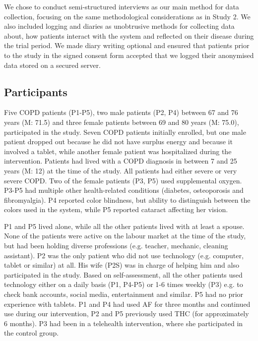 We chose to conduct semi-structured interviews as our main method for data collection, focusing on the same methodological considerations as in Study 2. We also included logging and diaries as unobtrusive methods for collecting data about, how patients interact with the system and reflected on their disease during the trial period. We made diary writing optional and ensured that patients prior to the study in the signed consent form accepted that we logged their anonymised data stored on a secured server. 

\subsection{Participants}
Five COPD patients (P1-P5), two male patients (P2, P4) between 67 and 76 years (M: 71.5) and three female patients between 69 and 80 years (M: 75.0), participated in the study. Seven COPD patients initially enrolled, but one male patient dropped out because he did not have surplus energy and because it involved a tablet, while another female patient was hospitalized during the intervention. Patients had lived with a COPD diagnosis in between 7 and 25 years (M: 12) at the time of the study. All patients had either severe or very severe COPD. Two of the female patients (P3, P5) used supplemental oxygen. P3-P5 had multiple other health-related conditions (diabetes, osteoporosis and fibromyalgia). P4 reported color blindness, but ability to distinguish between the colors used in the system, while P5 reported cataract affecting her vision. 

P1 and P5 lived alone, while all the other patients lived with at least a spouse. None of the patients were active on the labour market at the time of the study, but had been holding diverse professions (e.g. teacher, mechanic, cleaning assistant). P2 was the only patient who did not use technology (e.g. computer, tablet or similar) at all. His wife (P2S) was in charge of helping him and also participated in the study. Based on self-assessment, all the other patients used technology either on a daily basis (P1, P4-P5) or 1-6 times weekly (P3) e.g. to check bank accounts, social media, entertainment and similar. P5 had no prior experience with tablets. P1 and P4 had used AF for three months and continued use during our intervention, P2 and P5 previously used THC (for approximately 6 months). P3 had been in a telehealth intervention, where she participated in the control group.  



